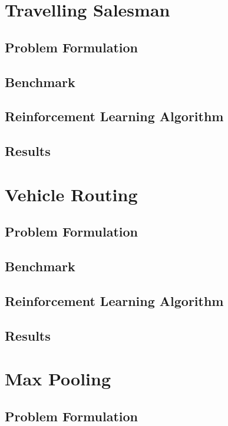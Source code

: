 \documentclass[12pt]{article}
\begin{document}
\section{Travelling Salesman}

\subsection{Problem Formulation}

\subsection{Benchmark}

\subsection{Reinforcement Learning Algorithm}

\subsection{Results}

\section{Vehicle Routing}

\subsection{Problem Formulation}

\subsection{Benchmark}

\subsection{Reinforcement Learning Algorithm}

\subsection{Results}

\section{Max Pooling}

\subsection{Problem Formulation}
\end{document}
